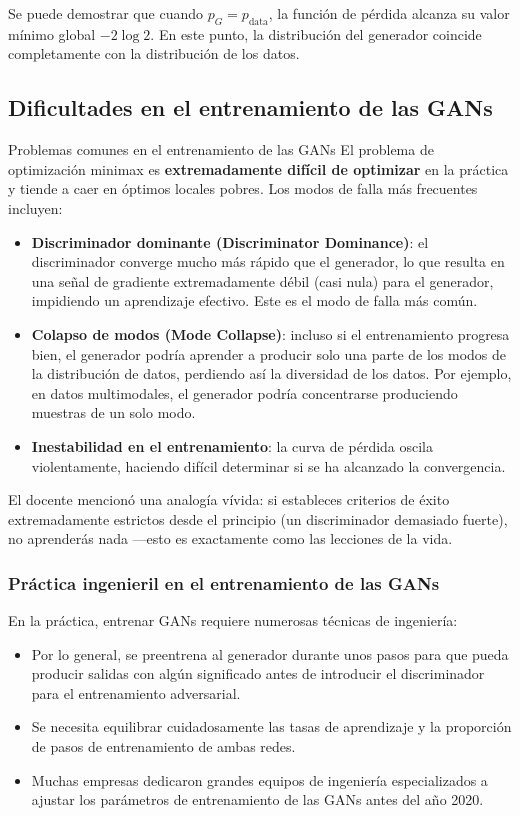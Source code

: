 \documentclass[a4paper]{article}
\begin{document}
Se puede demostrar que cuando $p_G = p_{\text{data}}$, la función de pérdida alcanza su valor mínimo global $-2\log 2$. En este punto, la distribución del generador coincide completamente con la distribución de los datos.

\subsection{Dificultades en el entrenamiento de las GANs}

\begin{warningbox}{Problemas comunes en el entrenamiento de las GANs}
El problema de optimización minimax es \textbf{extremadamente difícil de optimizar} en la práctica y tiende a caer en óptimos locales pobres. Los modos de falla más frecuentes incluyen:
\begin{itemize}
    \item \textbf{Discriminador dominante (Discriminator Dominance)}: el discriminador converge mucho más rápido que el generador, lo que resulta en una señal de gradiente extremadamente débil (casi nula) para el generador, impidiendo un aprendizaje efectivo. Este es el modo de falla más común.
    \item \textbf{Colapso de modos (Mode Collapse)}: incluso si el entrenamiento progresa bien, el generador podría aprender a producir solo una parte de los modos de la distribución de datos, perdiendo así la diversidad de los datos. Por ejemplo, en datos multimodales, el generador podría concentrarse produciendo muestras de un solo modo.
    \item \textbf{Inestabilidad en el entrenamiento}: la curva de pérdida oscila violentamente, haciendo difícil determinar si se ha alcanzado la convergencia.
\end{itemize}
\end{warningbox}

El docente mencionó una analogía vívida: si estableces criterios de éxito extremadamente estrictos desde el principio (un discriminador demasiado fuerte), no aprenderás nada —esto es exactamente como las lecciones de la vida.

\subsubsection{Práctica ingenieril en el entrenamiento de las GANs}

En la práctica, entrenar GANs requiere numerosas técnicas de ingeniería:

\begin{itemize}
    \item Por lo general, se preentrena al generador durante unos pasos para que pueda producir salidas con algún significado antes de introducir el discriminador para el entrenamiento adversarial.
    \item Se necesita equilibrar cuidadosamente las tasas de aprendizaje y la proporción de pasos de entrenamiento de ambas redes.
    \item Muchas empresas dedicaron grandes equipos de ingeniería especializados a ajustar los parámetros de entrenamiento de las GANs antes del año 2020.
\end{itemize}
\end{document}
